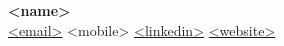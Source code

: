 
\begin{center}
	{\Huge \textbf{<name>}} \\[0.3em]
	\vspace{2pt}
	{\small \href{mailto:<email>}{<email>} \;\textbar\; <mobile> \;\textbar\; \href{<linkedin>}{<linkedin>} \;\textbar\; \href{<website>}{<website>}}
\end{center}
